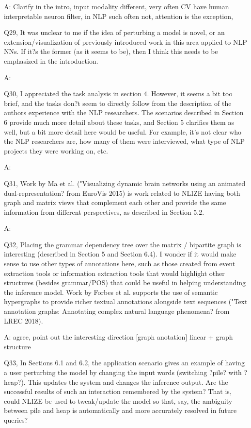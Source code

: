 A: Clarify in the intro, input modality different, very often CV have human interpretable neuron filter, in NLP such often not,   attention is the exception,

Q29, It was unclear to me if the idea of perturbing a model is novel, or an extension/visualization of previously introduced work in this area applied to NLP NNs. If it?s the former (as it seems to be), then I think this needs to be emphasized in the introduction.

A:

Q30, I appreciated the task analysis in section 4. However, it seems a bit too brief, and the tasks don?t seem to directly follow from the description of the authors experience with the NLP researchers. The scenarios described in Section 6 provide much more detail about these tasks, and Section 5 clarifies them as well, but a bit more detail here would be useful. For example, it's not clear who the NLP researchers are, how many of them were interviewed, what type of NLP projects they were working on, etc.

A:

Q31, Work by Ma et al. ("Visualizing dynamic brain networks using an animated dual-representation? from EuroVis 2015) is work related to NLIZE having both graph and matrix views that complement each other and provide the same information from different perspectives, as described in Section 5.2.

A:

Q32, Placing the grammar dependency tree over the matrix / bipartite graph is interesting (described in Section 5 and Section 6.4). I wonder if it would make sense to use other types of annotations here, such as those created from event extraction tools or information extraction tools that would highlight other structures (besides grammar/POS) that could be useful in helping understanding the inference model. Work by Forbes et al. supports the use of semantic hypergraphs to provide richer textual annotations alongside text sequences ("Text annotation graphs: Annotating complex natural language phenomena? from LREC 2018).

A: agree, point out the interesting direction [graph anotation] linear + graph structure

Q33, In Sections 6.1 and 6.2, the application scenario gives an example of having a user perturbing the model by changing the input words (switching ?pile? with ?heap?). This updates the system and changes the inference output. Are the successful results of such an interaction remembered by the system? That is, could NLIZE be used to tweak/update the model so that, say, the ambiguity between pile and heap is automatically and more accurately resolved in future queries?

